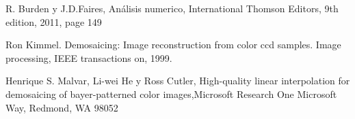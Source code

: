 \begin{thebibliography}{9}

  R. Burden y J.D.Faires, Análisis numerico, International Thomson Editors, 9th edition, 2011, page 149

Ron Kimmel. Demosaicing: Image reconstruction from color ccd samples. Image processing, IEEE transactions on, 1999.

Henrique S. Malvar, Li-wei He y Ross Cutler, High-quality linear interpolation for demosaicing of bayer-patterned color images,Microsoft Research One Microsoft Way, Redmond, WA 98052

\end{thebibliography}
